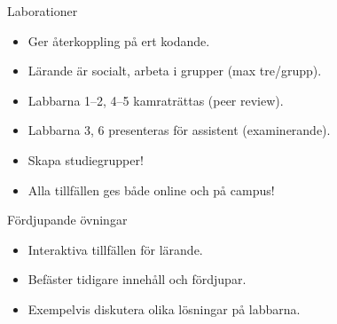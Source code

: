 \begin{frame}
  \begin{block}{Laborationer}
    \begin{itemize}
      \item Ger återkoppling på ert kodande.
      \item Lärande är socialt, arbeta i grupper (max tre/grupp).
      \item Labbarna 1--2, 4--5 kamraträttas (peer review).
      \item Labbarna 3, 6 presenteras för assistent (examinerande).
    \end{itemize}
  \end{block}

  \pause

  \begin{remark}
    \begin{itemize}
      \item Skapa studiegrupper!
    \end{itemize}
  \end{remark}
\end{frame}

\begin{frame}
  \begin{remark}
    \begin{itemize}
      \item Alla tillfällen ges både online och på campus!
    \end{itemize}
  \end{remark}
\end{frame}

\begin{frame}
  \begin{block}{Fördjupande övningar}
    \begin{itemize}
      \item Interaktiva tillfällen för lärande.
      \item Befäster tidigare innehåll och fördjupar.
      \item Exempelvis diskutera olika lösningar på labbarna.
    \end{itemize}
  \end{block}
\end{frame}


